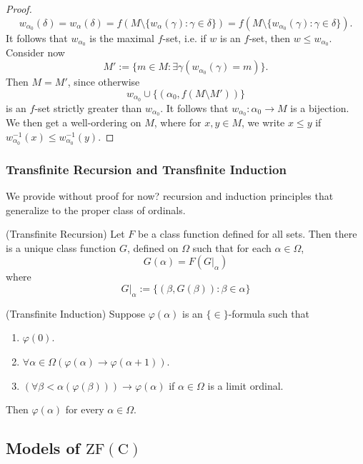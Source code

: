 \begin{proof}
    $$w_{\alpha_0}(\delta)=w_{\alpha}(\delta)=f(M\setminus \{w_\alpha(\gamma) : \gamma \in \delta\})=f(M\setminus \{w_{\alpha_0}(\gamma) : \gamma\in \delta\}).$$
    It follows that $w_{\alpha_0}$ is the maximal $f$-set, i.e. if $w$ is an $f$-set, then $w\leq w_{\alpha_0}$. Consider now 
    $$M':=\{m\in M : \exists \gamma(w_{\alpha_0}(\gamma)=m)\}.$$
    Then $M=M'$, since otherwise 
    $$w_{\alpha_0}\cup \{(\alpha_0, f(M\setminus M'))\}$$
    is an $f$-set strictly greater than $w_{\alpha_0}$. It follows that $w_{\alpha_0}:\alpha_0\rightarrow M$ is a bijection. We then get a well-ordering on $M$, where for $x,y\in M$, we write $x\leq y$ if $w_{\alpha_0}^{-1}(x)\leq w_{\alpha_0}^{-1}(y)$.
\end{proof}
\subsubsection{Transfinite Recursion and Transfinite Induction}
We provide without proof {\Large for now?} recursion and induction principles that generalize to the proper class of ordinals. 
\begin{theorem}\label{TransfiniteRecursion}(Transfinite Recursion)
    Let $F$ be a class function defined for all sets. Then there is a unique class function $G$, defined on $\Omega$ such that for each $\alpha\in \Omega$,
    $$
        G(\alpha) = F\left(\left.G\right|_\alpha\right)
    $$
    where 
    $$
        \left. G\right|_\alpha := \{(\beta,G(\beta)):\beta\in \alpha\}
    $$
\end{theorem}

\begin{theorem}\label{TransfiniteInduction}(Transfinite Induction) Suppose $\varphi(\alpha)$ is an $\{\in\}$-formula such that 
\begin{enumerate}
    \item $\varphi(0)$.
    \item $\forall\alpha\in \Omega(\varphi(\alpha)\rightarrow \varphi(\alpha+1))$.
    \item $(\forall \beta<\alpha(\varphi(\beta)))\rightarrow \varphi(\alpha)$ if $\alpha\in \Omega$ is a limit ordinal.
\end{enumerate}
Then $\varphi(\alpha)$ for every $\alpha\in \Omega$. 
\end{theorem}
\subsection{Models of $\mathrm{ZF(C)}$}
